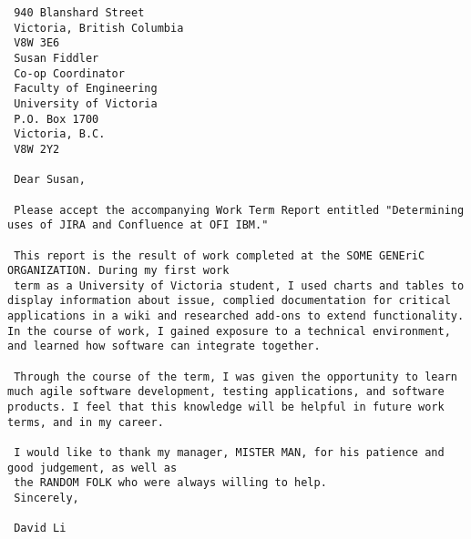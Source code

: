  \linespread{1}
 \begin{verbatim}
 940 Blanshard Street
 Victoria, British Columbia
 V8W 3E6
 Susan Fiddler
 Co-op Coordinator
 Faculty of Engineering
 University of Victoria
 P.O. Box 1700
 Victoria, B.C.
 V8W 2Y2
 
 Dear Susan, 
 
 Please accept the accompanying Work Term Report entitled "Determining uses of JIRA and Confluence at OFI IBM."
 
 This report is the result of work completed at the SOME GENEriC ORGANIZATION. During my first work 
 term as a University of Victoria student, I used charts and tables to display information about issue, complied documentation for critical applications in a wiki and researched add-ons to extend functionality. In the course of work, I gained exposure to a technical environment, and learned how software can integrate together. 
 
 Through the course of the term, I was given the opportunity to learn much agile software development, testing applications, and software products. I feel that this knowledge will be helpful in future work terms, and in my career.
 
 I would like to thank my manager, MISTER MAN, for his patience and good judgement, as well as
 the RANDOM FOLK who were always willing to help.
 Sincerely,

 David Li
 \end{verbatim}